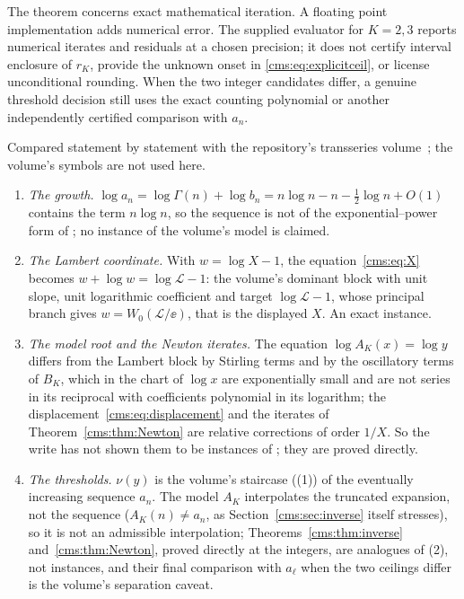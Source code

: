 The theorem concerns exact mathematical iteration. A floating point implementation adds numerical error. The supplied evaluator for $K=2,3$ reports numerical iterates and residuals at a chosen precision; it does not certify interval enclosure of $r_K$, provide the unknown onset in \eqref{cms:eq:explicitceil}, or license unconditional rounding. When the two integer candidates differ, a genuine threshold decision still uses the exact counting polynomial or another independently certified comparison with $a_n$.

\begin{remark}\label{cms:rem:transseries}
Compared statement by statement with the repository's transseries
volume~\cite{TSvol}; the volume's symbols are not used here.
\begin{enumerate}\raggedright
\item \emph{The growth.} $\log a_n=\log\Gamma(n)+\log b_n=n\log n-n-\frac12\log n+O(1)$
contains the term $n\log n$, so the sequence is not of the
exponential--power form of ; no instance of the volume's
model is claimed.
\item \emph{The Lambert coordinate.} With $w=\log X-1$, the
equation~\eqref{cms:eq:X} becomes $w+\log w=\log\mathcal L-1$: the volume's
dominant block  with unit slope, unit logarithmic
coefficient and target $\log\mathcal L-1$, whose principal branch gives
$w=W_0(\mathcal L/\ee)$, that is the displayed $X$. An exact instance.
\item \emph{The model root and the Newton iterates.} The equation
$\log A_K(x)=\log y$ differs from the Lambert block by Stirling terms and by
the oscillatory terms of $B_K$, which in the chart of $\log x$ are
exponentially small and are not series in its reciprocal with coefficients
polynomial in its logarithm; the displacement~\eqref{cms:eq:displacement} and
the iterates of Theorem~\ref{cms:thm:Newton} are relative corrections of
order $1/X$. So the write has not shown them to be instances of
; they are proved directly.
\item \emph{The thresholds.} $\nu(y)$ is the volume's staircase
((1)) of the eventually increasing sequence $a_n$.
The model $A_K$ interpolates the truncated expansion, not the sequence
($A_K(n)\ne a_n$, as Section~\ref{cms:sec:inverse} itself stresses), so it is
not an admissible interpolation; Theorems~\ref{cms:thm:inverse}
and~\ref{cms:thm:Newton}, proved directly at the integers, are analogues of
(2), not instances, and their final comparison with
$a_\ell$ when the two ceilings differ is the volume's separation caveat.
\end{enumerate}
\end{remark}
